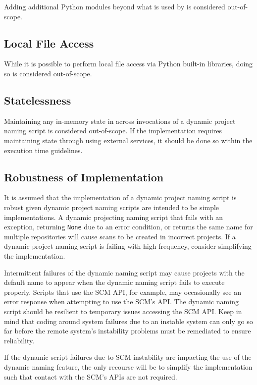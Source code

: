 Adding additional Python modules beyond what is used by \cxoneflow is considered out-of-scope.

\subsection{Local File Access}

While it is possible to perform local file access via Python built-in libraries, doing so
is considered out-of-scope.

\subsection{Statelessness}

Maintaining any in-memory state in across invocations of a dynamic project naming script is considered out-of-scope.
If the implementation requires maintaining state through using external services, it should be done so within the
execution time guidelines.

\subsection{Robustness of Implementation}

It is assumed that the implementation of a dynamic project naming script is robust given dynamic project naming scripts
are intended to be simple implementations.  A dynamic projecting naming script that fails with an exception, returning \texttt{None} due to an error
condition, or returns the same name for multiple repositories will cause scans to be created in incorrect projects.  If
a dynamic project naming script is failing with high frequency, consider simplifying the implementation.

Intermittent failures of the dynamic naming script may cause projects with the default name to appear when the dynamic
naming script fails to execute properly.  Scripts that use the SCM API, for example, may occasionally see an error
response when attempting to use the SCM's API.  The dynamic naming script should be resilient to temporary issues
accessing the SCM API.  Keep in mind that coding around system failures due to an instable system can only go so
far before the remote system's instability problems must be remediated to ensure reliability.

If the dynamic script failures due to SCM instability are impacting the use of the dynamic naming feature, the
only recourse will be to simplify the implementation such that contact with the SCM's APIs are not required.


